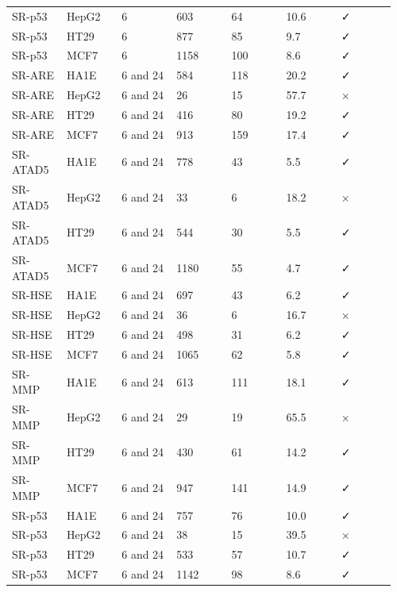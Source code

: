 \begin{longtable}{p{0.137\linewidth}p{0.137\linewidth}p{0.137\linewidth}p{0.137\linewidth}p{0.137\linewidth}p{0.137\linewidth}p{0.137\linewidth}}
SR-p53 & HepG2 & 6 & 603 & 64 & 10.6 & ✓ \\
SR-p53 & HT29 & 6 & 877 & 85 & 9.7 & ✓ \\
SR-p53 & MCF7 & 6 & 1158 & 100 & 8.6 & ✓ \\
SR-ARE & HA1E & 6 and 24 & 584 & 118 & 20.2 & ✓ \\
SR-ARE & HepG2 & 6 and 24 & 26 & 15 & 57.7 & × \\
SR-ARE & HT29 & 6 and 24 & 416 & 80 & 19.2 & ✓ \\
SR-ARE & MCF7 & 6 and 24 & 913 & 159 & 17.4 & ✓ \\
SR-ATAD5 & HA1E & 6 and 24 & 778 & 43 & 5.5 & ✓ \\
SR-ATAD5 & HepG2 & 6 and 24 & 33 & 6 & 18.2 & × \\
SR-ATAD5 & HT29 & 6 and 24 & 544 & 30 & 5.5 & ✓ \\
SR-ATAD5 & MCF7 & 6 and 24 & 1180 & 55 & 4.7 & ✓ \\
SR-HSE & HA1E & 6 and 24 & 697 & 43 & 6.2 & ✓ \\
SR-HSE & HepG2 & 6 and 24 & 36 & 6 & 16.7 & × \\
SR-HSE & HT29 & 6 and 24 & 498 & 31 & 6.2 & ✓ \\
SR-HSE & MCF7 & 6 and 24 & 1065 & 62 & 5.8 & ✓ \\
SR-MMP & HA1E & 6 and 24 & 613 & 111 & 18.1 & ✓ \\
SR-MMP & HepG2 & 6 and 24 & 29 & 19 & 65.5 & × \\
SR-MMP & HT29 & 6 and 24 & 430 & 61 & 14.2 & ✓ \\
SR-MMP & MCF7 & 6 and 24 & 947 & 141 & 14.9 & ✓ \\
SR-p53 & HA1E & 6 and 24 & 757 & 76 & 10.0 & ✓ \\
SR-p53 & HepG2 & 6 and 24 & 38 & 15 & 39.5 & × \\
SR-p53 & HT29 & 6 and 24 & 533 & 57 & 10.7 & ✓ \\
SR-p53 & MCF7 & 6 and 24 & 1142 & 98 & 8.6 & ✓ \\
\bottomrule
\end{longtable}

